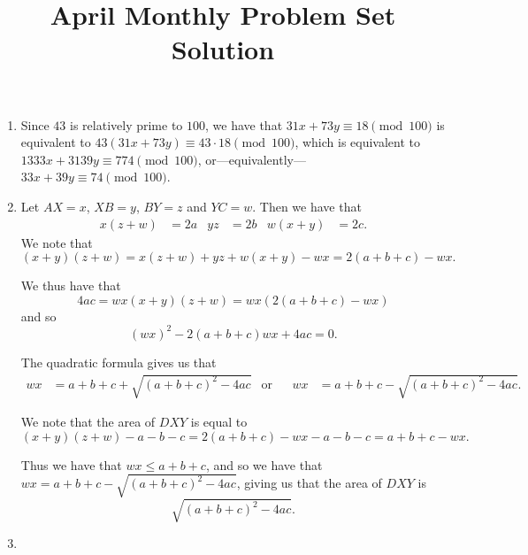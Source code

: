 \documentclass[12pt]{article}
\title{April Monthly Problem Set Solution}
\author{\vspace{-24pt}}
\date{\vspace{-24pt}}
\begin{document}
 \maketitle \pagestyle{empty}

\begin{enumerate}

\item %
Since $43$ is relatively prime to $100$, we have that $31x + 73y \equiv 18
\pmod{100}$ is equivalent to $43(31x + 73y) \equiv 43 \cdot 18 \pmod{100}$,
which is equivalent to $1333x + 3139y \equiv 774 \pmod{100}$,
or---equivalently---$33x + 39y \equiv 74 \pmod{100}$.

\item %
Let $AX = x$, $XB = y$, $BY = z$ and $YC = w$. Then we have that
\begin{align*}
  x(z + w) & = 2a & yz & = 2b & w(x + y) & = 2c.
\end{align*}
We note that
\[
  (x + y)(z + w) = x(z + w) + yz + w(x + y) - wx = 2(a + b + c) - wx.
\]

We thus have that
\[
  4ac = wx(x + y)(z + w) = wx(2(a + b + c) - wx)
\]
and so
\[
  {(wx)}^2 - 2(a + b + c)wx + 4ac = 0.
\]

The quadratic formula gives us that
\begin{align*}
  wx & = a + b + c + \sqrt{{(a + b + c)}^2 - 4ac} & \text{or} && wx & = a + b + c
  - \sqrt{{(a + b + c)}^2 - 4ac}.
\end{align*}

We note that the area of $DXY$ is equal to
\[
  (x + y)(z + w) - a - b - c = 2(a + b + c) - wx - a - b - c = a + b + c - wx.
\]

Thus we have that $wx \leq a + b + c$, and so we have that $wx = a + b + c -
\sqrt{{(a + b + c)}^2 - 4ac}$, giving us that the area of $DXY$ is
\[
    \sqrt{{(a + b + c)}^2 - 4ac}.
\]

\item %



\end{enumerate}
\end{document}
